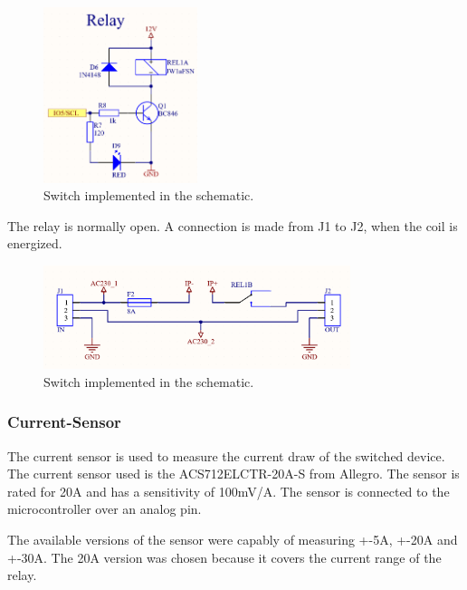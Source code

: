         \begin{figure}[H]
            \centering
            \includegraphics[width=0.4\textwidth]{assets/HW/Relay-Coil-schematic.png}
            \caption{Switch implemented in the schematic.}
        \end{figure}

        The relay is normally open. A connection is made from J1 to J2, when the coil is energized.

        \begin{figure}[H]
            \centering
            \includegraphics[width=0.8\textwidth]{assets/HW/Relay-Contact-schematic.png}
            \caption{Switch implemented in the schematic.}
        \end{figure}
    
    \subsubsection{Current-Sensor}

        The current sensor is used to measure the current draw of the switched device. The current
        sensor used is the ACS712ELCTR-20A-S from Allegro. The sensor is rated for 20A and has a 
        sensitivity of 100mV/A. The sensor is connected to the microcontroller over an analog pin.

        The available versions of the sensor were capably of measuring +-5A, +-20A and +-30A. 
        The 20A version was chosen because it covers the current range of the relay. 

